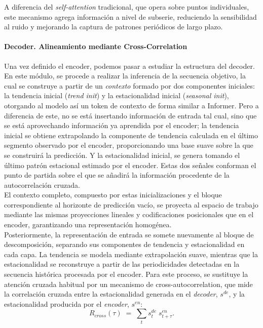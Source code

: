 A diferencia del \textit{self-attention} tradicional, que opera sobre puntos individuales, este mecanismo agrega información a nivel de subserie, reduciendo la sensibilidad al ruido y mejorando la captura de patrones periódicos de largo plazo.

\paragraph{Decoder. Alineamiento mediante Cross-Correlation}

Una vez definido el encoder, podemos pasar a estudiar la estructura del decoder. En este módulo, se procede a realizar la inferencia de la secuencia objetivo, la cual se construye a partir de un \textit{contexto} formado por dos componentes iniciales: la tendencia inicial (\textit{trend init}) y la estacionalidad inicial (\textit{seasonal init}), otorgando al modelo así un token de contexto de forma similar a Informer. Pero a diferencia de este, no se está insertando información de entrada tal cual, sino que se está aprovechando información ya aprendida por el encoder; la tendencia inicial se obtiene extrapolando la componente de tendencia calculada en el último segmento observado por el encoder, proporcionando una base suave sobre la que se construirá la predicción. Y la estacionalidad inicial, se genera tomando el último patrón estacional estimado por el encoder. Estas dos señales conforman el punto de partida sobre el que se añadirá la información procedente de la autocorrelación cruzada.\\

El contexto completo, compuesto por estas inicializaciones y el bloque correspondiente al horizonte de predicción vacío, se proyecta al espacio de trabajo mediante las mismas proyecciones lineales y codificaciones posicionales que en el encoder, garantizando una representación homogénea.\\

Posteriormente, la representación de entrada se somete nuevamente al bloque de descomposición, separando sus componentes de tendencia y estacionalidad en cada capa. La tendencia se modela mediante extrapolación suave, mientras que la estacionalidad se reconstruye a partir de las periodicidades detectadas en la secuencia histórica procesada por el encoder. Para este proceso,  se sustituye la atención cruzada habitual por un mecanismo de cross-autocorrelation, que mide la correlación cruzada entre la estacionalidad generada en el \textit{decoder}, $s^{de}$, y la estacionalidad producida por el \textit{encoder}, $s^{en}$:
\begin{equation}
    R_{cross}(\tau) \;=\; \sum_{t} s^{de}_t \; s^{en}_{t+\tau}.
\end{equation}

